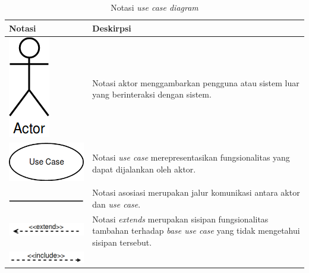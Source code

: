 \begin{longtable}{|>{\centering}m{5cm}|m{7cm}|}
  \caption{Notasi \emph{use case diagram} \parencite{rumbaugh2004unified}}\label{tab:notasi-use-case}
  \\\hline
  \textbf{Notasi} & \textbf{Deskirpsi} \\\hline
  \includegraphics[width=.1\linewidth]{img/uml-notation/actor}
                         & Notasi aktor menggambarkan pengguna atau
                           sistem luar yang berinteraksi dengan
                           sistem. \\\hline
  \includegraphics[width=.4\linewidth]{img/uml-notation/usecase}
                         & Notasi \emph{use case} merepresentasikan
                           fungsionalitas yang dapat dijalankan oleh
                           aktor. \\\hline
  \includegraphics[width=.6\linewidth]{img/uml-notation/path}
                         & Notasi asosiasi merupakan jalur komunikasi
                           antara aktor dan \emph{use case}. \\\hline
  \includegraphics[width=.6\linewidth]{img/uml-notation/extends}
                         & Notasi \emph{extends} merupakan sisipan
                           fungsionalitas tambahan terhadap \emph{base
                           use case} yang tidak mengetahui sisipan
                           tersebut. \\\hline
  \includegraphics[width=.6\linewidth]{img/uml-notation/include}

\end{longtable}
